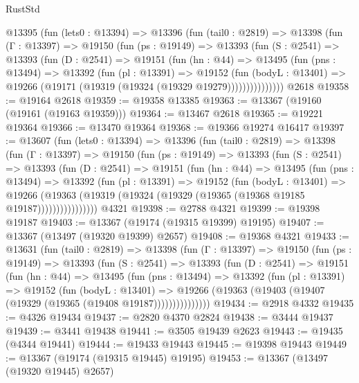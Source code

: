 \begin{lexlean}{RustStd}
\begin{coremodule}
    @13395
      (fun (lets0 : @13394) =>
      @13396
        (fun (tail0 : @2819) =>
        @13398
          (fun (Γ : @13397) =>
          @19150
            (fun (ps : @19149) =>
            @13393
              (fun (S : @2541) =>
              @13393
                (fun (D : @2541) =>
                @19151
                  (fun (hn : @44) =>
                  @13495
                    (fun (pns : @13494) =>
                    @13392
                      (fun (pl : @13391) =>
                      @19152
                        (fun (bodyL : @13401) =>
                        @19266 (@19171 (@19319 (@19324 (@19329 @19279)))))))))))))))
    @2618
@19358 := @19164 @2618
@19359 := @19358 @13385
@19363 := @13367 (@19160 (@19161 (@19163 @19359)))
@19364 := @13467 @2618
@19365 := @19221 @19364
@19366 := @13470 @19364
@19368 := @19366 @19274 @16417
@19397 := @13607
    (fun (lets0 : @13394) =>
    @13396
      (fun (tail0 : @2819) =>
      @13398
        (fun (Γ : @13397) =>
        @19150
          (fun (ps : @19149) =>
          @13393
            (fun (S : @2541) =>
            @13393
              (fun (D : @2541) =>
              @19151
                (fun (hn : @44) =>
                @13495
                  (fun (pns : @13494) =>
                  @13392
                    (fun (pl : @13391) =>
                    @19152
                      (fun (bodyL : @13401) =>
                      @19266
                        (@19363
                          (@19319 (@19324 (@19329 (@19365 (@19368 @19185 @19187))))))))))))))))
    @4321
@19398 := @2788 @4321
@19399 := @19398 @19187
@19403 := @13367 (@19174 (@19315 @19399) @19195)
@19407 := @13367 (@13497 (@19320 @19399) @2657)
@19408 := @19368 @4321
@19433 := @13631
    (fun (tail0 : @2819) =>
    @13398
      (fun (Γ : @13397) =>
      @19150
        (fun (ps : @19149) =>
        @13393
          (fun (S : @2541) =>
          @13393
            (fun (D : @2541) =>
            @19151
              (fun (hn : @44) =>
              @13495
                (fun (pns : @13494) =>
                @13392
                  (fun (pl : @13391) =>
                  @19152
                    (fun (bodyL : @13401) =>
                    @19266 (@19363 (@19403 (@19407 (@19329 (@19365 (@19408 @19187)))))))))))))))
@19434 := @2918 @4332
@19435 := @4326 @19434
@19437 := @2820 @4370 @2824
@19438 := @3444 @19437
@19439 := @3441 @19438
@19441 := @3505 @19439 @2623
@19443 := @19435 (@4344 @19441)
@19444 := @19433 @19443
@19445 := @19398 @19443
@19449 := @13367 (@19174 (@19315 @19445) @19195)
@19453 := @13367 (@13497 (@19320 @19445) @2657)

\end{coremodule}
\end{lexlean}
